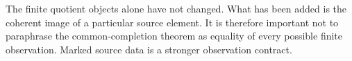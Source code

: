 The finite quotient objects alone have not changed. What has been added is the coherent image of a particular source element. It is therefore important not to paraphrase the common-completion theorem as equality of every possible finite observation. Marked source data is a stronger observation contract.
